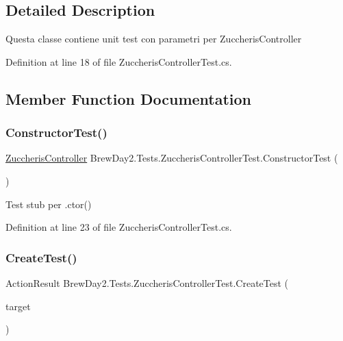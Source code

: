 \subsection{Detailed Description}
Questa classe contiene unit test con parametri per Zuccheris\+Controller



Definition at line 18 of file Zuccheris\+Controller\+Test.\+cs.



\subsection{Member Function Documentation}
\mbox{\label{class_brew_day2_1_1_tests_1_1_zuccheris_controller_test_af36c5e8da8a2a820c5bb9631cf0154c9}} 
\subsubsection{\texorpdfstring{Constructor\+Test()}{ConstructorTest()}}
{\footnotesize\ttfamily \mbox{\hyperlink{class_brew_day2_1_1_controllers_1_1_zuccheris_controller}{Zuccheris\+Controller}} Brew\+Day2.\+Tests.\+Zuccheris\+Controller\+Test.\+Constructor\+Test (\begin{DoxyParamCaption}{ }\end{DoxyParamCaption})}



Test stub per .ctor()



Definition at line 23 of file Zuccheris\+Controller\+Test.\+cs.

\mbox{\label{class_brew_day2_1_1_tests_1_1_zuccheris_controller_test_a974f1c86334ca081abd0105a621b32bf}} 
\subsubsection{\texorpdfstring{Create\+Test()}{CreateTest()}}
{\footnotesize\ttfamily Action\+Result Brew\+Day2.\+Tests.\+Zuccheris\+Controller\+Test.\+Create\+Test (\begin{DoxyParamCaption}\item[{\mbox{[}\+Pex\+Assume\+Under\+Test\mbox{]} \mbox{\hyperlink{class_brew_day2_1_1_controllers_1_1_zuccheris_controller}{Zuccheris\+Controller}}}]{target }\end{DoxyParamCaption})}




